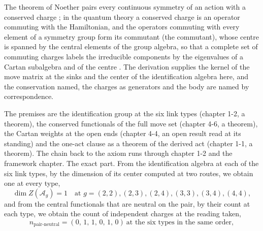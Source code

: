 \begin{chbridge}
The theorem of Noether pairs every continuous symmetry of an action with a conserved charge \cite{Noether1918}; in the quantum theory a conserved charge is an operator commuting with the Hamiltonian, and the operators commuting with every element of a symmetry group form its commutant (the commutant), whose centre is spanned by the central elements of the group algebra, so that a complete set of commuting charges labels the irreducible components by the eigenvalues of a Cartan subalgebra and of the centre \cite{Hall2015,Weyl1927}. The derivation supplies the kernel of the move matrix at the sinks and the center of the identification algebra here, and the conservation named, the charges as generators and the body are named by correspondence.
\end{chbridge}
\begin{chproof}
The premises are the identification group at the six link types (chapter 1-2, a theorem), the conserved functionals of the full move set (chapter 4-6, a theorem), the Cartan weights at the open ends (chapter 4-4, an open result read at its standing) and the one-act clause as a theorem of the derived act (chapter 1-1, a theorem). The chain back to the axiom runs through chapter 1-2 and the framework chapter. The exact part. From the identification algebra at each of the six link types, by the dimension of its center computed at two routes, we obtain one at every type,
\begin{equation}
\dim Z(\mathcal{A}_{g}) = 1 \quad\text{at } g = (2,2),(2,3),(2,4),(3,3),(3,4),(4,4) ,
\end{equation}
and from the central functionals that are neutral on the pair, by their count at each type, we obtain the count of independent charges at the reading taken,
\begin{equation}
n_{\mathrm{pair\text{-}neutral}} = (0,\,1,\,1,\,0,\,1,\,0) \ \text{at the six types in the same order} ,
\end{equation}

\end{chproof}
